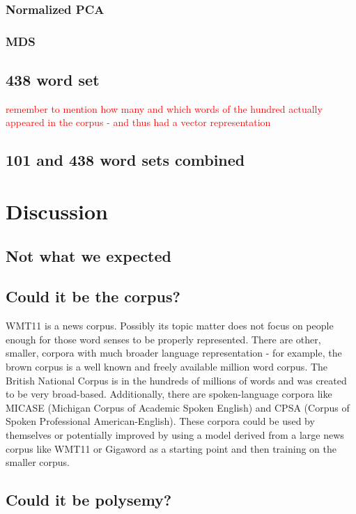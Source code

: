 \documentclass[10pt,letterpaper]{book}
\newcommand{\todo}[1]{\textcolor{red}{#1}}
\begin{document}
\subsection{Normalized PCA}

\subsection{MDS}

\section{438 word set}

\todo{remember to mention how many and which words of the hundred actually appeared in the corpus - and thus had a vector representation}


\section{101 and 438 word sets combined}

\chapter{Discussion}

\section{Not what we expected}

\section{Could it be the corpus?}

WMT11 is a news corpus. Possibly its topic matter does not focus on people enough for those word senses to be properly represented. There are other, smaller, corpora with much broader language representation - for example, the brown corpus is a well known and freely available million word corpus. The British National Corpus is in the hundreds of millions of words and was created to be very broad-based. Additionally, there are spoken-language corpora like MICASE (Michigan Corpus of Academic Spoken English) and CPSA (Corpus of Spoken Professional American-English). These corpora could be used by themselves or potentially improved by using a model derived from a large news corpus like WMT11 or Gigaword as a starting point and then training on the smaller corpus.

\section{Could it be polysemy?}
\end{document}
